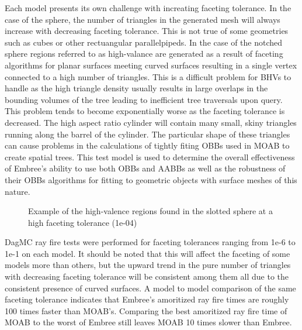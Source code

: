 \documentclass{anstrans}
\begin{document}
Each model presents its own challenge with increating faceting tolerance. In the case of the sphere, the number of triangles in the generated mesh will always increase with decreasing faceting tolerance. This is not true of some geometries such as cubes or other rectuangular parallelpipeds. In the case of the notched sphere regions referred to as high-valance are generated as a result of faceting algorithms for planar surfaces meeting curved surfaces resulting in a single vertex connected to a high number of triangles. This is a difficult problem for BHVs to handle as the high triangle density usually results in large overlaps in the bounding volumes of the tree leading to inefficient tree traversals upon query. This problem tends to become exponentially worse as the faceting tolerance is decreased. The high aspect ratio cylinder will contain many small, skiny triangles running along the barrel of the cylinder. The particular shape of these triangles can cause problems in the calculations of tightly fiting OBBs used in MOAB to create spatial trees. This test model is used to determine the overall effectiveness of Embree's ability to use both OBBs and AABBs as well as the robustness of their OBBs algorithms for fitting to geometric objects with surface meshes of this nature.

\begin{figure}

  \begin{center}

    \caption{Example of the high-valence regions found in the slotted sphere at a high faceting tolerance (1e-04)}

  \end{center}

\end{figure}

DagMC ray fire tests were performed for faceting tolerances ranging from 1e-6 to 1e-1 on each model. It should be noted that this will affect the faceting of some models more than others, but the upward trend in the pure number of triangles with decreasing faceting tolerance will be consistent among them all due to the consistent presence of curved surfaces. A model to model comparison of the same faceting tolerance indicates that Embree's amoritized ray fire times are roughly 100 times faster than MOAB's. Comparing the best amoritized ray fire time of MOAB to the worst of Embree still leaves MOAB 10 times slower than Embree.
\end{document}
